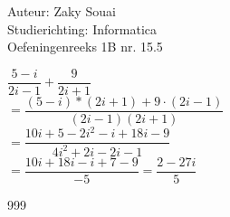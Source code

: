 \documentclass[a4paper]{article}
\begin{document}
  
\noindent \large Auteur: Zaky Souai \\
\noindent \large Studierichting:  Informatica\\
\noindent \large Oefeningenreeks 1B nr. 15.5\\

\bigskip

\normalsize

$\dfrac{5 - i}{2i - 1} + \dfrac{9}{2i + 1} $ \\

$= \dfrac{(5 - i) * (2i + 1) + 9 \cdot (2i - 1)}{(2i - 1)(2i + 1)}$ \\

$= \dfrac{10i + 5 - 2i^2 - i + 18i - 9}{4i^2 + 2i - 2i - 1}$ \\

$= \dfrac{10i + 18i - i + 7 - 9}{-5} = \dfrac{2 - 27i}{5}$ \\





\begin{thebibliography}{999}
\end{thebibliography}
\end{document}
